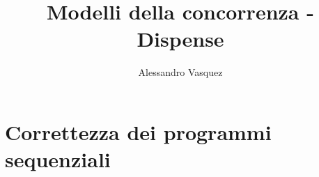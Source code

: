 \documentclass[11pt,a4paper]{report}
\author{Alessandro Vasquez}
\title{Modelli della concorrenza - Dispense}
\begin{document}
	\maketitle
	\newpage
	\tableofcontents
	\newpage
	
	\part{Correttezza dei programmi sequenziali}
	
	
\end{document}
